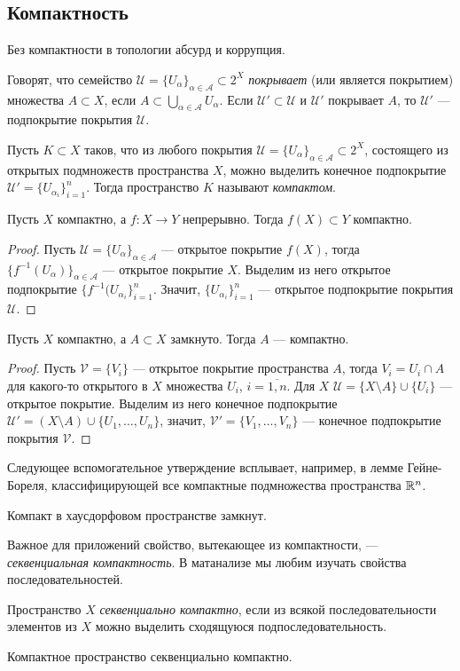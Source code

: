 \subsection{Компактность}
Без компактности в топологии абсурд и коррупция.
\begin{defin}
	Говорят, что семейство $\mathcal{U}=\{U_{\alpha}\}_{\alpha\in\mathcal{A}}\subset 2^X$ \textit{покрывает} (или является покрытием) множества $A\subset X$, если $A\subset\bigcup\limits_{\alpha\in\mathcal{A}} U_{\alpha}$. Если $\mathcal{U}'\subset\mathcal{U}$ и $\mathcal{U}'$ покрывает $A$, то $\mathcal{U}'$ --- подпокрытие покрытия $\mathcal{U}$.
\end{defin}
\begin{defin}
	Пусть $K\subset X$ таков, что из любого покрытия $\mathcal{U}=\{U_{\alpha}\}_{\alpha\in\mathcal{A}}\subset 2^X$, состоящего из открытых подмножеств пространства $X$, можно выделить конечное подпокрытие $\mathcal{U}'=\{U_{\alpha_i}\}_{i=1}^n$. Тогда пространство $K$ называют \textit{компактом}.
\end{defin}
\begin{prop}
	Пусть $X$ компактно, а $f\colon X\to Y$ непрерывно. Тогда $f(X)\subset Y$ компактно.
\end{prop}
\begin{proof}
	Пусть $\mathcal{U}=\{U_{\alpha}\}_{\alpha\in\mathcal{A}}$ --- открытое покрытие $f(X)$, тогда $\{f^{-1}(U_{\alpha})\}_{\alpha\in\mathcal{A}}$ --- открытое покрытие $X$. Выделим из него открытое подпокрытие $\{f^{-1}(U_{\alpha_i}\}_{i=1}^n$. Значит, $\{U_{\alpha_i}\}_{i=1}^n$ --- открытое подпокрытие покрытия $\mathcal{U}$.
\end{proof}
\begin{prop}
	Пусть $X$ компактно, а $A\subset X$ замкнуто. Тогда $A$ --- компактно.
\end{prop}
\begin{proof}
	Пусть $\mathcal{V}=\{V_i\}$ --- открытое покрытие пространства $A$, тогда $V_i=U_i\cap A$ для какого-то открытого в $X$ множества $U_i$, $i=\overline{1,n}$. Для $X$ $\mathcal{U}=\{X\setminus A\}\cup\{U_i\}$ --- открытое покрытие. Выделим из него конечное подпокрытие $\mathcal{U}'=(X\setminus A)\cup\{U_1,\ldots, U_n\}$, значит, $\mathcal{V}'=\{V_1,\ldots, V_n\}$ --- конечное подпокрытие покрытия $\mathcal{V}$.
\end{proof}
Следующее вспомогательное утверждение всплывает, например, в лемме Гейне-Бореля, классифицирующей все компактные подмножества пространства $\mathbb {R}^n$.
\begin{prop}
	Компакт в хаусдорфовом пространстве замкнут.
\end{prop}

Важное для приложений свойство, вытекающее из компактности, --- \textit{секвенциальная компактность}. В матанализе мы любим изучать свойства последовательностей.
\begin{defin}
	Пространство $X$ \textit{секвенциально компактно}, если из всякой последовательности элементов из $X$ можно выделить сходящуюся подпоследовательность.
\end{defin}
\begin{prop}
	Компактное пространство секвенциально компактно.
\end{prop}
